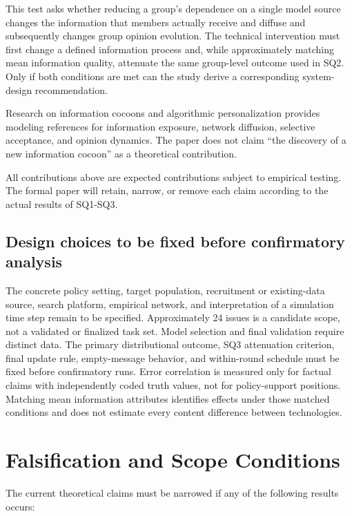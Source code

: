 \documentclass[11pt,a4paper]{article}
\begin{document}
This test asks whether reducing a group's dependence on a single model source changes the information that members actually receive and diffuse and subsequently changes group opinion evolution. The technical intervention must first change a defined information process and, while approximately matching mean information quality, attenuate the same group-level outcome used in SQ2. Only if both conditions are met can the study derive a corresponding system-design recommendation.

Research on information cocoons and algorithmic personalization provides modeling references for information exposure, network diffusion, selective acceptance, and opinion dynamics. The paper does not claim ``the discovery of a new information cocoon'' as a theoretical contribution.

All contributions above are expected contributions subject to empirical testing. The formal paper will retain, narrow, or remove each claim according to the actual results of SQ1-SQ3.

\subsection{Design choices to be fixed before confirmatory analysis}

The concrete policy setting, target population, recruitment or existing-data source, search platform, empirical network, and interpretation of a simulation time step remain to be specified. Approximately 24 issues is a candidate scope, not a validated or finalized task set. Model selection and final validation require distinct data. The primary distributional outcome, SQ3 attenuation criterion, final update rule, empty-message behavior, and within-round schedule must be fixed before confirmatory runs. Error correlation is measured only for factual claims with independently coded truth values, not for policy-support positions. Matching mean information attributes identifies effects under those matched conditions and does not estimate every content difference between technologies.

\section{Falsification and Scope Conditions}

The current theoretical claims must be narrowed if any of the following results occurs:
\end{document}
